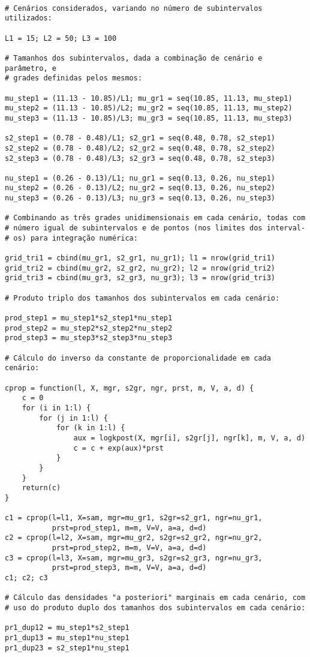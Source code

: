 \begin{verbatim}

# Cenários considerados, variando no número de subintervalos utilizados:

L1 = 15; L2 = 50; L3 = 100

# Tamanhos dos subintervalos, dada a combinação de cenário e parâmetro, e
# grades definidas pelos mesmos:

mu_step1 = (11.13 - 10.85)/L1; mu_gr1 = seq(10.85, 11.13, mu_step1)
mu_step2 = (11.13 - 10.85)/L2; mu_gr2 = seq(10.85, 11.13, mu_step2)
mu_step3 = (11.13 - 10.85)/L3; mu_gr3 = seq(10.85, 11.13, mu_step3)

s2_step1 = (0.78 - 0.48)/L1; s2_gr1 = seq(0.48, 0.78, s2_step1)
s2_step2 = (0.78 - 0.48)/L2; s2_gr2 = seq(0.48, 0.78, s2_step2)
s2_step3 = (0.78 - 0.48)/L3; s2_gr3 = seq(0.48, 0.78, s2_step3)

nu_step1 = (0.26 - 0.13)/L1; nu_gr1 = seq(0.13, 0.26, nu_step1)
nu_step2 = (0.26 - 0.13)/L2; nu_gr2 = seq(0.13, 0.26, nu_step2)
nu_step3 = (0.26 - 0.13)/L3; nu_gr3 = seq(0.13, 0.26, nu_step3)

# Combinando as três grades unidimensionais em cada cenário, todas com
# número igual de subintervalos e de pontos (nos limites dos interval-
# os) para integração numérica:

grid_tri1 = cbind(mu_gr1, s2_gr1, nu_gr1); l1 = nrow(grid_tri1)
grid_tri2 = cbind(mu_gr2, s2_gr2, nu_gr2); l2 = nrow(grid_tri2)
grid_tri3 = cbind(mu_gr3, s2_gr3, nu_gr3); l3 = nrow(grid_tri3)

# Produto triplo dos tamanhos dos subintervalos em cada cenário:

prod_step1 = mu_step1*s2_step1*nu_step1
prod_step2 = mu_step2*s2_step2*nu_step2
prod_step3 = mu_step3*s2_step3*nu_step3

# Cálculo do inverso da constante de proporcionalidade em cada cenário:

cprop = function(l, X, mgr, s2gr, ngr, prst, m, V, a, d) {
	c = 0
	for (i in 1:l) {
		for (j in 1:l) {
			for (k in 1:l) {
				aux = logkpost(X, mgr[i], s2gr[j], ngr[k], m, V, a, d)
				c = c + exp(aux)*prst
			}
		}
	}
	return(c)
}

c1 = cprop(l=l1, X=sam, mgr=mu_gr1, s2gr=s2_gr1, ngr=nu_gr1,
		   prst=prod_step1, m=m, V=V, a=a, d=d)
c2 = cprop(l=l2, X=sam, mgr=mu_gr2, s2gr=s2_gr2, ngr=nu_gr2,
		   prst=prod_step2, m=m, V=V, a=a, d=d)
c3 = cprop(l=l3, X=sam, mgr=mu_gr3, s2gr=s2_gr3, ngr=nu_gr3,
		   prst=prod_step3, m=m, V=V, a=a, d=d)
c1; c2; c3

# Cálculo das densidades "a posteriori" marginais em cada cenário, com
# uso do produto duplo dos tamanhos dos subintervalos em cada cenário:

pr1_dup12 = mu_step1*s2_step1
pr1_dup13 = mu_step1*nu_step1
pr1_dup23 = s2_step1*nu_step1
\end{verbatim}

